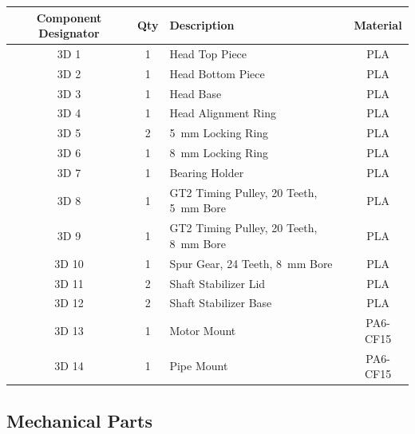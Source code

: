 \begin{tabularx}{\textwidth}{|C|c|X|c|}
    \hline
    \textbf{Component} \textbf{Designator}& \textbf{Qty} & \textbf{Description} & \textbf{Material} \\
    \hline
    3D 1 & 1 & Head Top Piece & PLA \\
    3D 2 & 1 & Head Bottom Piece & PLA \\
    3D 3 & 1 &  Head Base & PLA \\
    3D 4 & 1 &  Head Alignment Ring & PLA \\
    3D 5 & 2 &  \SI{5}{mm} Locking Ring & PLA \\
    3D 6 & 1 &  \SI{8}{mm} Locking Ring & PLA \\
    3D 7 & 1 &  Bearing Holder & PLA \\
    3D 8 & 1 &  GT2 Timing Pulley, 20 Teeth, \SI{5}{mm} Bore & PLA \\
    3D 9 & 1 &  GT2 Timing Pulley, 20 Teeth, \SI{8}{mm} Bore & PLA \\
    3D 10 & 1 & Spur Gear, 24 Teeth, \SI{8}{mm} Bore & PLA \\
    3D 11 & 2 & Shaft Stabilizer Lid & PLA \\
    3D 12 & 2 & Shaft Stabilizer Base & PLA \\
    3D 13 & 1 & Motor Mount & PA6-CF15 \\
    3D 14 & 1 & Pipe Mount & PA6-CF15 \\
    \hline
\end{tabularx}

\newpage

\subsection{Mechanical Parts}

